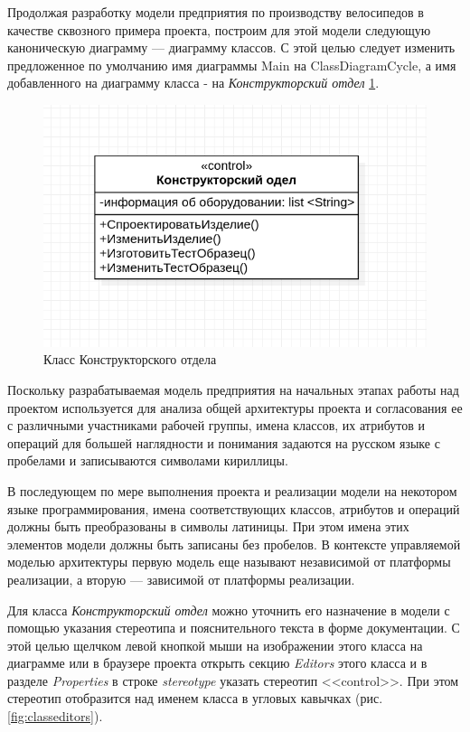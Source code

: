 \documentclass[a4paper,12pt]{report}
\begin{document}
Продолжая разработку модели предприятия по производству велосипедов в качестве сквозного примера проекта, построим для этой модели следующую каноническую диаграмму --- диаграмму классов. С этой целью следует изменить предложенное по умолчанию имя диаграммы Main на ClassDiagramCycle, а имя добавленного на диаграмму класса - на \textit{Конструкторский отдел} \ref{fig:constructclass}.

\begin{figure}[h!]
	\centering
	\includegraphics[width=0.7\linewidth]{images/constructclass}
	\caption{Класс Конструкторского отдела}
	\label{fig:constructclass}
\end{figure}

Поскольку разрабатываемая модель предприятия на начальных этапах работы над проектом используется для анализа общей архитектуры проекта и согласования ее с различными участниками рабочей группы, имена классов, их атрибутов и операций для большей наглядности и понимания задаются на русском языке с пробелами и записываются символами кириллицы.

В последующем по мере выполнения проекта и реализации модели на некотором языке программирования, имена соответствующих классов, атрибутов и операций должны быть преобразованы в символы латиницы. При этом имена этих элементов модели должны быть записаны без пробелов. В контексте управляемой моделью архитектуры первую модель еще называют независимой от платформы реализации, а вторую --- зависимой от платформы реализации.

Для класса \textit{Конструкторский отдел} можно уточнить его назначение в модели с помощью указания стереотипа и пояснительного текста в форме документации. С этой целью щелчком левой кнопкой мыши на изображении этого класса на диаграмме или в браузере проекта открыть секцию \textit{Editors} этого класса и в разделе \textit{Properties} в строке \textit{stereotype} указать стереотип <<control>>. При этом стереотип отобразится над именем класса в угловых кавычках (рис. \ref{fig:classeditors}).
\end{document}

